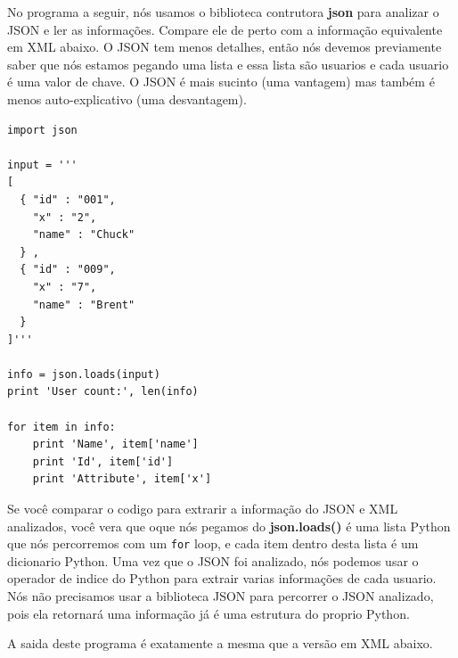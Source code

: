 No programa a seguir, nós usamos o biblioteca contrutora {\bf json} para analizar
o JSON e ler as informações. Compare ele de perto com a informação equivalente em XML
abaixo. O JSON tem menos detalhes, então nós devemos previamente saber que nós
estamos pegando uma lista e essa lista são usuarios e cada usuario é uma valor de 
chave. O JSON é mais sucinto (uma vantagem) mas também é menos auto-explicativo 
(uma desvantagem).

\beforeverb
\begin{verbatim}
import json

input = '''
[
  { "id" : "001",
    "x" : "2",
    "name" : "Chuck"
  } ,
  { "id" : "009",
    "x" : "7",
    "name" : "Brent"
  } 
]'''

info = json.loads(input)
print 'User count:', len(info)

for item in info:
    print 'Name', item['name']
    print 'Id', item['id']
    print 'Attribute', item['x']
\end{verbatim}
\afterverb
%

Se você comparar o codigo para extrarir a informação do JSON e XML analizados,
você vera que oque nós pegamos do {\bf json.loads()} é uma lista Python
que nós percorremos com um {\tt for} loop, e cada item dentro desta lista
é um dicionario Python. Uma vez que o JSON foi analizado, nós podemos usar o
operador de indice do Python para extrair varias informações de cada usuario.
Nós não precisamos usar a biblioteca JSON para percorrer o JSON analizado, 
pois ela retornará uma informação já é uma estrutura do proprio Python.

A saida deste programa é exatamente a mesma que a versão em XML abaixo.

